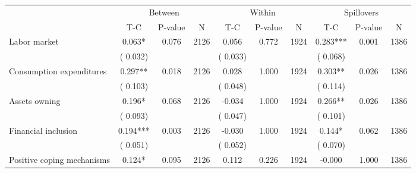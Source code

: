 
\begin{tabular}{l*{9}{c}}\hline&\multicolumn{3}{c}{Between}&\multicolumn{3}{c}{Within}&\multicolumn{3}{c}{Spillovers} \\ \cmidrule(r){2-4}\cmidrule(l){5-7}\cmidrule(l){8-10} & {T-C} & {P-value} & {N} & {T-C} & {P-value} & {N}  & {T-C} & {P-value} & {N}  \\ \midrule
 Labor market                 &              0.063*          &        0.076 & 2126          &              0.056          &        0.772 & 1924          &        0.283*** &        0.001 & 1386                 \\ 
                               &        (       0.032) & &                                                                 &       (       0.033) & &                                                          &       (       0.068)      & &     \\ 
 Consumption expenditures                 &              0.297**          &        0.018 & 2126          &              0.028 &        1.000 & 1924                   &        0.303** &        0.026 & 1386                 \\ 
                               &        (       0.103) & &                                                                 &       (       0.048) & &                                                          &       (       0.114) & &  \\ 
 Assets owning                 &              0.196*          &        0.068 & 2126          &             -0.034 &        1.000 & 1924                   &        0.266** &        0.026 & 1386                 \\ 
                               &        (       0.093) & &                                                                 &       (       0.047) & &                                                          & (       0.101)                                    \\ 
 Financial inclusion                 &              0.194***          &        0.003 & 2126          &             -0.030 &        1.000 & 1924                   &        0.144* &        0.062 & 1386                 \\ 
                               &        (       0.051) & &                                                                 &       (       0.052) & &                                                          &       (       0.070) & &   \\ 
 Positive coping mechanisms                 &              0.124*          &        0.095 & 2126          &              0.112 &        0.226 & 1924                   &       -0.000 &        1.000 & 1386                 \\ 

\end{tabular}
